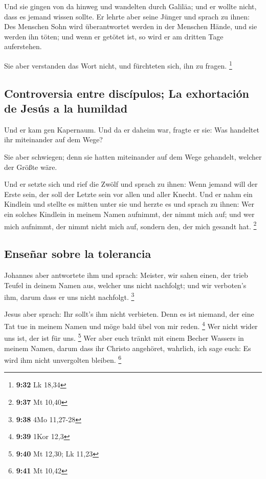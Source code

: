  Und sie gingen von da hinweg und wandelten durch
Galiläa; und er wollte nicht, dass es jemand wissen sollte.
 Er lehrte aber seine Jünger und sprach zu ihnen: Des
Menschen Sohn wird überantwortet werden in der Menschen Hände, und sie
werden ihn töten; und wenn er getötet ist, so wird er am dritten Tage
auferstehen.

 Sie aber verstanden das Wort nicht, und fürchteten sich,
ihn zu fragen. \footnote{\textbf{9:32} Lk 18,34}

\hypertarget{controversia-entre-discuxedpulos-la-exhortaciuxf3n-de-jesuxfas-a-la-humildad}{%
\subsection{Controversia entre discípulos; La exhortación de Jesús a la
humildad}\label{controversia-entre-discuxedpulos-la-exhortaciuxf3n-de-jesuxfas-a-la-humildad}}

 Und er kam gen Kapernaum. Und da er daheim war, fragte
er sie: Was handeltet ihr miteinander auf dem Wege?

 Sie aber schwiegen; denn sie hatten miteinander auf dem
Wege gehandelt, welcher der Größte wäre.

 Und er setzte sich und rief die Zwölf und sprach zu
ihnen: Wenn jemand will der Erste sein, der soll der Letzte sein vor
allen und aller Knecht.  Und er nahm ein Kindlein und
stellte es mitten unter sie und herzte es und sprach zu ihnen:
 Wer ein solches Kindlein in meinem Namen aufnimmt, der
nimmt mich auf; und wer mich aufnimmt, der nimmt nicht mich auf, sondern
den, der mich gesandt hat. \footnote{\textbf{9:37} Mt 10,40}

\hypertarget{enseuxf1ar-sobre-la-tolerancia}{%
\subsection{Enseñar sobre la
tolerancia}\label{enseuxf1ar-sobre-la-tolerancia}}

 Johannes aber antwortete ihm und sprach: Meister, wir
sahen einen, der trieb Teufel in deinem Namen aus, welcher uns nicht
nachfolgt; und wir verboten's ihm, darum dass er uns nicht nachfolgt.
\footnote{\textbf{9:38} 4Mo 11,27-28}

 Jesus aber sprach: Ihr sollt's ihm nicht verbieten. Denn
es ist niemand, der eine Tat tue in meinem Namen und möge bald übel von
mir reden. \footnote{\textbf{9:39} 1Kor 12,3}  Wer nicht
wider uns ist, der ist für uns. \footnote{\textbf{9:40} Mt 12,30; Lk
  11,23}  Wer aber euch tränkt mit einem Becher Wassers
in meinem Namen, darum dass ihr Christo angehöret, wahrlich, ich sage
euch: Es wird ihm nicht unvergolten bleiben. \footnote{\textbf{9:41} Mt
  10,42}

